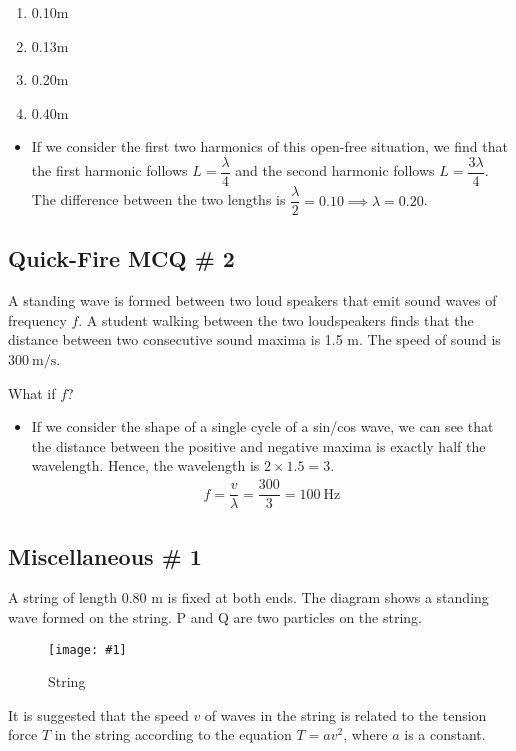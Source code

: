 \documentclass[a4paper,12pt]{article}
\newcommand{\img}[4]{\begin{center}
  \begin{figure}[H]
    \centering
    \texttt{[image: \#1]}
    \caption{#3}
    \label{fig:#4}
  \end{figure}
\end{center}}
\begin{document}
\begin{enumerate}[label=\Alph*]
  \item 0.10m
  \item 0.13m
  \item 0.20m
  \item 0.40m
\end{enumerate}

\begin{itemize}
  \item If we consider the first two harmonics of this open-free situation, we find that the first harmonic follows $L = \dfrac{\lambda}{4}$ and the second harmonic follows $L = \dfrac{3\lambda}{4}$. The difference between the two lengths is $\dfrac{\lambda}{2} = 0.10 \implies \lambda = 0.20$.
\end{itemize}

\pagebreak

\subsection{Quick-Fire MCQ \# 2}
A standing wave is formed between two loud speakers that emit sound waves of frequency $f$. A student walking between the two loudspeakers finds that the distance between two consecutive sound maxima is 1.5 m. The speed of sound is $\qty{300}{\m\per\s}$.

What if $f$?
\begin{itemize}
  \item If we consider the shape of a single cycle of a sin/cos wave, we can see that the distance between the positive and negative maxima is exactly half the wavelength. Hence, the wavelength is $2 \times 1.5 = 3$.
        \begin{align*}
          f = \dfrac{v}{\lambda} = \dfrac{300}{3} = \qty{100}{\Hz}
        \end{align*}
\end{itemize}

\pagebreak

\subsection{Miscellaneous \# 1}

A string of length 0.80 m is fixed at both ends. The diagram shows a standing wave formed on the string. P and Q are two particles on the string.

\img{ex/5.png}{0.8}{String}{string}

It is suggested that the speed $v$ of waves in the string is related to the tension force $T$ in the string according to the equation $T = av^2$, where $a$ is a constant.
\end{document}

